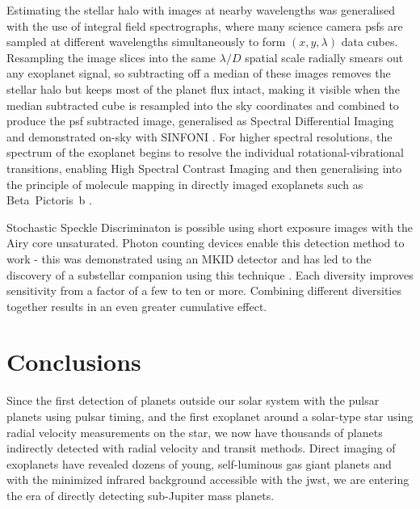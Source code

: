 \documentclass[letterpaper]{ar-1col}
\newcommand{\ld}{$\lambda/D$}
\begin{document}
Estimating the stellar halo with images at nearby wavelengths was generalised with the use of integral field spectrographs, where many science camera \acp{psf} are sampled at different wavelengths simultaneously to form $(x,y,\lambda)$ data cubes.
%
Resampling the image slices into the same \ld{} spatial scale radially smears out any exoplanet signal, so subtracting off a median of these images removes the stellar halo but keeps most of the planet flux intact, making it visible when the median subtracted cube is resampled into the sky coordinates and combined to produce the \ac{psf} subtracted image, generalised as Spectral Differential Imaging \cite[SDI; ][]{Sparks02} and demonstrated on-sky with SINFONI \citep{Thatte07}.
%
For higher spectral resolutions, the spectrum of the exoplanet begins to resolve the individual rotational-vibrational transitions, enabling High Spectral Contrast Imaging \citep[including the detection of HD~209458b ][]{Snellen10} and then generalising into the principle of molecule mapping in directly imaged exoplanets such as Beta~Pictoris~b \citep{Hoeijmakers18}.

Stochastic Speckle Discriminaton \citep[SSD; ][]{Gladysz09} is possible using short exposure images with the Airy core unsaturated.
%
Photon counting devices enable this detection method to work - this was demonstrated using an MKID detector and has led to the discovery of a substellar companion using this technique \citep{Steiger21}.
%
Each diversity improves sensitivity from a factor of a few to ten or more.
%
Combining different diversities together results in an even greater cumulative effect.

\section{Conclusions}

Since the first detection of planets outside our solar system with the pulsar planets \citep{Wolszczan92} using pulsar timing, and the first exoplanet around a solar-type star \citep[51 Peg b; ][]{Mayor95} using radial velocity measurements on the star, we now have thousands of planets indirectly detected with radial velocity and transit methods.
%
Direct imaging of exoplanets have revealed dozens of young, self-luminous gas giant planets \citep{Currie23,Chauvin24} and with the minimized infrared background accessible with the \ac{jwst}, we are entering the era of directly detecting sub-Jupiter mass planets.
\end{document}

